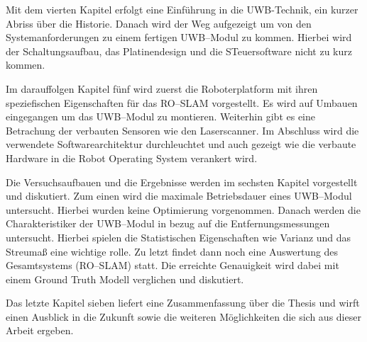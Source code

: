 Mit dem vierten Kapitel erfolgt eine Einführung in die UWB-Technik, ein kurzer Abriss über die Historie. Danach wird der Weg aufgezeigt um von den Systemanforderungen zu einem fertigen UWB--Modul zu kommen. Hierbei wird der Schaltungsaufbau, das Platinendesign und die STeuersoftware nicht zu kurz kommen.

Im darauffolgen Kapitel fünf wird zuerst die Roboterplatform mit ihren speziefischen Eigenschaften für das RO--SLAM vorgestellt. Es wird auf Umbauen eingegangen um das UWB--Modul zu montieren. Weiterhin gibt es eine Betrachung der verbauten Sensoren wie den Laserscanner. Im Abschluss wird die verwendete Softwarearchitektur durchleuchtet und auch gezeigt wie die verbaute Hardware in die Robot Operating System verankert wird.

Die Versuchsaufbauen und die Ergebnisse werden im sechsten Kapitel vorgestellt und diskutiert. Zum einen wird die maximale Betriebsdauer eines UWB--Modul untersucht. Hierbei wurden keine Optimierung vorgenommen. Danach werden die Charakteristiker der UWB--Modul in bezug auf die Entfernungsmessungen untersucht. Hierbei spielen die Statistischen Eigenschaften wie Varianz und das Streumaß eine wichtige rolle. Zu letzt findet dann noch eine Auswertung des Gesamtsystems (RO--SLAM) statt. Die erreichte Genauigkeit wird dabei mit einem Ground Truth Modell verglichen und diskutiert.

Das letzte Kapitel sieben liefert eine Zusammenfassung über die Thesis und wirft einen Ausblick in die Zukunft sowie die weiteren Möglichkeiten die sich aus dieser Arbeit ergeben.

